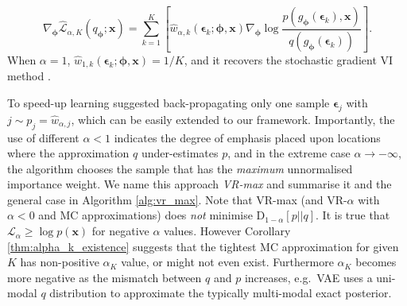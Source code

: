 \begin{equation}
\nabla_{\bm{\phi}} \hat{\mathcal{L}}_{\alpha, K}(q_{\bm{\phi}}; \bm{x}) 
= \sum_{k=1}^K \left[ \hat{w}_{\alpha, k}(\bm{\epsilon}_k; \bm{\phi}, \bm{x}) \nabla_{\bm{\phi}} \log \frac{p(g_{\bm{\phi}}(\bm{\epsilon}_k), \bm{x})}{q(g_{\bm{\phi}}(\bm{\epsilon}_k))} \right].
\end{equation}
When $\alpha = 1$, $\hat{w}_{1, k}(\bm{\epsilon}_k; \bm{\phi}, \bm{x}) = 1/K$, and it recovers the stochastic gradient VI method \cite{kingma:vae}.

To speed-up learning \cite{burda:iwae} suggested back-propagating only one sample $\bm{\epsilon}_j$ with $j \sim p_j = \hat{w}_{\alpha, j}$, which can be easily extended to our framework. Importantly, the use of different $\alpha < 1$ indicates the degree of emphasis placed upon locations where the approximation $q$ under-estimates $p$, and in the extreme case $\alpha \rightarrow -\infty$, the algorithm chooses the sample that has the \emph{maximum} unnormalised importance weight. 
%
We name this approach \emph{VR-max} and summarise it and the general case in Algorithm \ref{alg:vr_max}. 
%
Note that VR-max (and VR-$\alpha$ with $\alpha < 0$ and MC approximations) does \emph{not} minimise $\mathrm{D}_{1-\alpha}[p||q]$. It is true that $\mathcal{L}_{\alpha} \geq \log p(\bm{x})$ for negative $\alpha$ values. However Corollary \ref{thm:alpha_k_existence} suggests that the tightest MC approximation for given $K$ has non-positive $\alpha_K$ value, or might not even exist. Furthermore $\alpha_K$ becomes more negative as the mismatch between $q$ and $p$ increases, e.g.~VAE uses a uni-modal $q$ distribution to approximate the typically multi-modal exact posterior.



